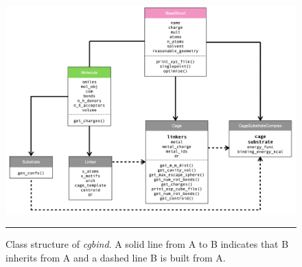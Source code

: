 \documentclass[../../main.tex]{subfiles}
\begin{document}
\begin{figure}[h!]
	\vspace{0.4cm}
	\centering
	\includegraphics[width=\textwidth]{3/cgbind/figs/fig1}
	\vspace{0.2cm}
	\hrule
	\caption{Class structure of \emph{cgbind}. A solid line from A to B indicates that B inherits from A and a dashed line B is built from A.}
	\label{fig::cg_1}
\end{figure}
\end{document}
